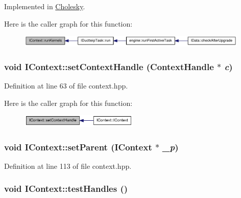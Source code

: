Implemented in \hyperlink{class_cholesky_ab025e03f8a91169e1945602f0020b61e}{Cholesky}.

Here is the caller graph for this function:\nopagebreak
\begin{figure}[H]
\begin{center}
\leavevmode
\includegraphics[width=312pt]{class_i_context_a7e432ff03dfc96f39e8343b28f17fb74_icgraph}
\end{center}
\end{figure}
\hypertarget{class_i_context_ae51caa1b552828bab3e5317c0efad541}{
\subsubsection[{setContextHandle}]{\setlength{\rightskip}{0pt plus 5cm}void IContext::setContextHandle ({\bf ContextHandle} $\ast$ {\em c})}}
\label{class_i_context_ae51caa1b552828bab3e5317c0efad541}


Definition at line 63 of file context.hpp.

Here is the caller graph for this function:\nopagebreak
\begin{figure}[H]
\begin{center}
\leavevmode
\includegraphics[width=159pt]{class_i_context_ae51caa1b552828bab3e5317c0efad541_icgraph}
\end{center}
\end{figure}
\hypertarget{class_i_context_ae51615a53a707370e7aec0fe9fbf9c28}{
\subsubsection[{setParent}]{\setlength{\rightskip}{0pt plus 5cm}void IContext::setParent ({\bf IContext} $\ast$ {\em \_\-p})}}
\label{class_i_context_ae51615a53a707370e7aec0fe9fbf9c28}


Definition at line 113 of file context.hpp.\hypertarget{class_i_context_adff746ec169ed33998d86aa306ee3d93}{
\subsubsection[{testHandles}]{\setlength{\rightskip}{0pt plus 5cm}void IContext::testHandles ()}}
\label{class_i_context_adff746ec169ed33998d86aa306ee3d93}



